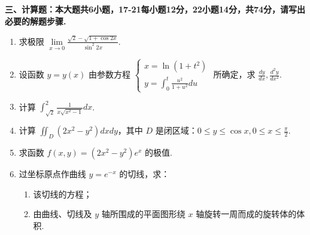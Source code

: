 \documentclass[12pt, a4paper]{article}
\begin{document}
\vspace{2em}

\noindent \textbf{三、计算题：本大题共6小题，17-21每小题12分，22小题14分，共74分，请写出必要的解题步骤.}

\begin{enumerate}[label=\arabic*、, itemsep=6em, start=17]
    \item 求极限 $\lim\limits_{x \to 0} \frac{\sqrt{2} - \sqrt{1 + \cos 2x}}{\sin^2 2x}$.
    
    \item 设函数 $y = y(x)$ 由参数方程 $\begin{cases} x = \ln(1+t^2) \\ y = \int_0^t \frac{u^2}{1+u^2} du \end{cases}$ 所确定，求 $\frac{dy}{dx}, \frac{d^2y}{dx^2}$.
    
    \item 计算 $\int_{\sqrt{2}}^{2} \frac{1}{x\sqrt{x^2-1}} dx$.
    
    \item 计算 $\iint_{D} (2x^2 - y^2) dxdy$，其中 $D$ 是闭区域：$0 \le y \le \cos x, 0 \le x \le \frac{\pi}{2}$.
    
    \item 求函数 $f(x,y) = (2x^2 - y^2)e^x$ 的极值.
    
    \item 过坐标原点作曲线 $y = e^{-x}$ 的切线，求：
    \begin{enumerate}[label=（\arabic*）]
        \item 该切线的方程；
        \item 由曲线、切线及 $y$ 轴所围成的平面图形绕 $x$ 轴旋转一周而成的旋转体的体积.
    \end{enumerate}
\end{enumerate}
\end{document}
